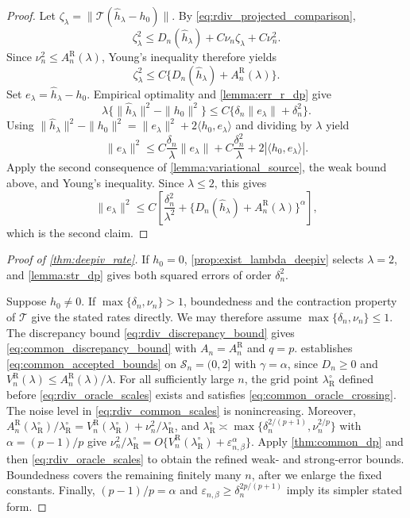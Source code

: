 \begin{proof}
Let $\zeta_\lambda=\|\mathcal T(\hat h_\lambda-h_0)\|$. By \eqref{eq:rdiv_projected_comparison},
\[
\zeta_\lambda^2\leqslant D_n(\hat h_\lambda)
+C\nu_n\zeta_\lambda+C\nu_n^2.
\]
Since $\nu_n^2\leqslant A_n^{\mathrm R}(\lambda)$, Young's inequality therefore yields
\[
\zeta_\lambda^2\leqslant C \{D_n(\hat h_\lambda)+A_n^{\mathrm R}(\lambda)\}.
\]
Set $e_\lambda=\hat h_\lambda-h_0$. Empirical optimality and
\cref{lemma:err_r_dp} give
\[
\lambda\{\|\hat h_\lambda\|^2-\|h_0\|^2\}
\leqslant C\{\delta_n\|e_\lambda\|+\delta_n^2\}.
\]
Using $\|\hat h_\lambda\|^2-\|h_0\|^2
=\|e_\lambda\|^2+2\langle h_0,e_\lambda\rangle$ and dividing by
$\lambda$ yield
\[
\|e_\lambda\|^2
\leqslant C\frac{\delta_n}{\lambda}\|e_\lambda\|
+C\frac{\delta_n^2}{\lambda}
+2|\langle h_0,e_\lambda\rangle|.
\]
Apply the second consequence of \cref{lemma:variational_source}, the
weak bound above, and Young's inequality. Since $\lambda\leqslant2$, this gives
\[
\|e_\lambda\|^2
\leqslant C\left[\frac{\delta_n^2}{\lambda^2}
+\{D_n(\hat h_\lambda)+A_n^{\mathrm R}(\lambda)\}^\alpha\right],
\]
which is the second claim.
\end{proof}

\begin{proof}[Proof of \cref{thm:deepiv_rate}]
If $h_0=0$, \cref{prop:exist_lambda_deepiv} selects $\lambda=2$, and \cref{lemma:str_dp} gives both squared errors of order $\delta_n^2$.

Suppose $h_0\ne0$. If $\max\{\delta_n,\nu_n\}>1$, boundedness and the contraction property of $\mathcal T$ give the stated rates directly. We may therefore assume $\max\{\delta_n,\nu_n\}\leqslant1$. The discrepancy bound \eqref{eq:rdiv_discrepancy_bound} gives
\eqref{eq:common_discrepancy_bound} with
$A_n=A_n^{\mathrm R}$ and $q=p$.
 establishes
\eqref{eq:common_accepted_bounds} on $\mathcal S_n=(0,2]$ with
$\gamma=\alpha$, since $D_n\geqslant0$ and
$V_n^{\mathrm R}(\lambda)\leqslant A_n^{\mathrm R}(\lambda)/\lambda$.
For all sufficiently large $n$, the grid point
$\lambda_{\mathrm R}^\circ$ defined before
\eqref{eq:rdiv_oracle_scales} exists and satisfies
\eqref{eq:common_oracle_crossing}. The noise level in
\eqref{eq:rdiv_common_scales} is nonincreasing. Moreover,
$A_n^{\mathrm R}(\lambda_{\mathrm R}^\circ)/\lambda_{\mathrm R}^\circ
=V_n^{\mathrm R}(\lambda_{\mathrm R}^\circ)+\nu_n^2/\lambda_{\mathrm R}^\circ$, and
$\lambda_{\mathrm R}^\circ\asymp\max\{\delta_n^{2/(p+1)},\nu_n^{2/p}\}$ with $\alpha=(p-1)/p$ give
$\nu_n^2/\lambda_{\mathrm R}^\circ
=O\{V_n^{\mathrm R}(\lambda_{\mathrm R}^\circ)+\varepsilon_{n,\beta}^\alpha\}$.
Apply
\cref{thm:common_dp} and then
\eqref{eq:rdiv_oracle_scales} to obtain the refined weak- and
strong-error bounds. Boundedness covers the remaining finitely many $n$, after we enlarge the fixed constants. Finally,
$(p-1)/p=\alpha$ and $\varepsilon_{n,\beta}\geqslant
\delta_n^{2p/(p+1)}$ imply its simpler stated form.
\end{proof}

